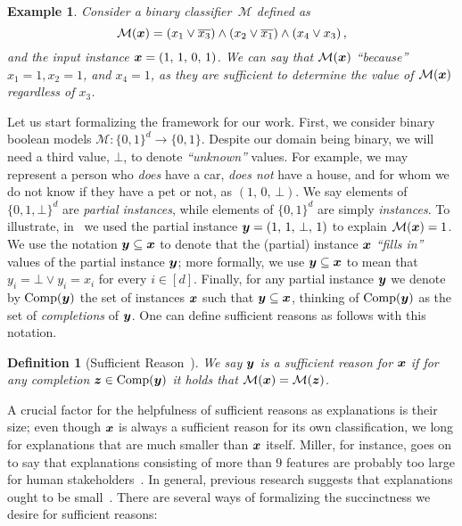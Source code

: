 \documentclass[letterpaper]{article} %
\newtheorem{definition}{Definition}
\newtheorem{example}{Example}
\newcommand{\M}{\mathcal{M}}
\DeclareMathOperator{\comp}{Comp}
\begin{document}
\begin{example}
Consider a binary classifier~$\M$ defined as 
	\[
	\M(\vx) = \left(x_1 \lor \overline{x_3}\right) \land   \left(x_2 \lor \overline{x_1}\right) \land \left(x_4 \lor x_3\right),
	\]
	and the input instance ${\bm{x}} = \left( 1, \,  1, \, 0, \, 1 \right)$. We can say that $\M(\vx)$ ``because'' $x_1 = 1, x_2 = 1$, and $x_4 = 1$, as they are sufficient to determine the value of $\M(\vx)$ regardless of $x_3$.
	\label{ex:sufficient-reason}
\end{example}

Let us start formalizing the framework for our work.  First, we consider binary boolean models $\M\colon \{0, 1\}^d \to \{0, 1\}$. Despite our domain being binary, we will need a third value, $\bot$, to denote \emph{``unknown''} values.  For example, we may represent a person who \emph{does} have a car, \emph{does not} have a house, and for whom we do not know if they have a pet or not, as $\left(1, \, 0, \, \bot\right)$. 
We say elements of $\{0, 1, \bot\}^d$ are \emph{partial instances}, while elements of $\{0, 1\}^d$ are simply \emph{instances}. To illustrate, in~ we used the partial instance ${\bm{y}} = \left(1, \, 1, \, \bot, \, 1 \right)$ to explain $\M(\vx) = 1$.
We use the notation ${\bm{y}} \subseteq {\bm{x}}$ to denote that the (partial) instance ${\bm{x}}$ \emph{``fills in''} values of the partial instance ${\bm{y}}$; more formally, we use ${\bm{y}} \subseteq {\bm{x}}$ to mean that $y_i = \bot \lor y_i = x_i$ for every $i \in [d]$. Finally, for any partial instance ${\bm{y}}$ we denote by $\comp(\vy)$ the set of instances ${\bm{x}}$ such that ${\bm{y}} \subseteq {\bm{x}}$, thinking of $\comp(\vy)$ as the set of \emph{completions} of ${\bm{y}}$. One can define sufficient reasons as follows with this notation.

\begin{definition}[Sufficient Reason~\cite{Darwiche_Hirth_2020}]
	We say ${\bm{y}}$ is a \emph{sufficient reason} for ${\bm{x}}$ if for any completion $\vz \in \comp(\vy)$ it holds that $\M(\vx) = \M(\vz)$.
	\label{def:sufficient-reason}
\end{definition}
A crucial factor for the helpfulness of sufficient reasons as explanations is their size; even though ${\bm{x}}$ is always a sufficient reason for its own classification, we long for explanations that are much smaller than ${\bm{x}}$ itself. Miller, for instance, goes on to say that explanations consisting of more than $9$ features are probably too large for human stakeholders~\cite{millerMagicalNumberSeven1956}. In general, previous research suggests that explanations ought to be small~\cite{Narayanan_Chen_He_Kim_Gershman_Doshi-Velez_2018, Lage_Chen_He_Narayanan_Kim_Gershman_Doshi-Velez_2019}.
There are several ways of formalizing the succinctness we desire for sufficient reasons:
\end{document}
